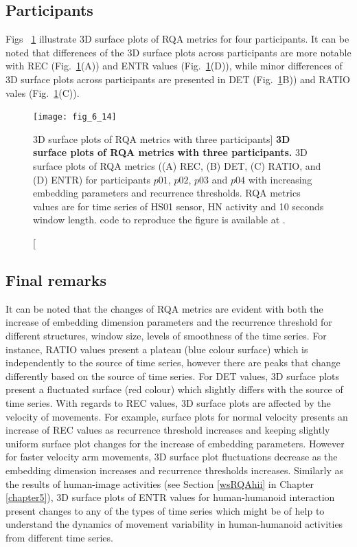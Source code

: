 \subsection{Participants}
Figs ~\ref{fig:topo_participants} illustrate 3D surface plots of RQA metrics for 
four participants.
It can be noted that differences of the 3D surface plots across participants 
are more notable with REC (Fig.~\ref{fig:topo_participants}(A)) and 
ENTR values (Fig.~\ref{fig:topo_participants}(D)),
while minor differences of 3D surface plots across participants are 
presented in
DET (Fig.~\ref{fig:topo_participants}B)) and 
RATIO vales (Fig.~\ref{fig:topo_participants}(C)).
\begin{figure}
\centering
\texttt{[image: fig\_6\_14]}
    \caption
	[3D surface plots of RQA metrics with three participants]{
	{\bf 3D surface plots of RQA metrics with three participants.}
	3D surface plots of RQA metrics ((A) REC, (B) DET, (C) RATIO, and (D) ENTR) 
	for participants $p01$, $p02$, $p03$ and $p04$ with increasing embedding 
	parameters and recurrence thresholds.
	RQA metrics values are for time series of HS01 sensor, 
	HN activity and 10 seconds window length.
	\R code to reproduce the figure is available at 
	.
 }
\label{fig:topo_participants}
\end{figure}

\newpage
\subsection{Final remarks}
It can be noted that the changes of RQA metrics are evident
with both the increase of embedding dimension parameters and the 
recurrence threshold for different structures, window size, 
levels of smoothness of the time series. 
For instance, RATIO values present a plateau (blue colour surface) 
which is independently to the source of time series, 
however there are peaks that change 
differently based on the source of time series. 
For DET values, 3D surface plots present a fluctuated surface (red colour)
which slightly differs with the source of time series.
With regards to REC values, 3D surface plots are affected by the velocity
of movements. For example, surface plots for normal velocity presents 
an increase of REC values as recurrence threshold increases and 
keeping slightly uniform surface plot changes for the increase 
of embedding parameters.
However for faster velocity arm movements, 3D surface plot fluctuations 
decrease as the embedding dimension increases and 
recurrence thresholds increases.
Similarly as the results of human-image activities  
(see Section \ref{wsRQAhii} in Chapter \ref{chapter5}), 
3D surface plots of ENTR values for human-humanoid interaction  
present changes to any of the types of time series 
which might be of help to understand 
the dynamics of 
movement variability in human-humanoid activities
from different time series.


